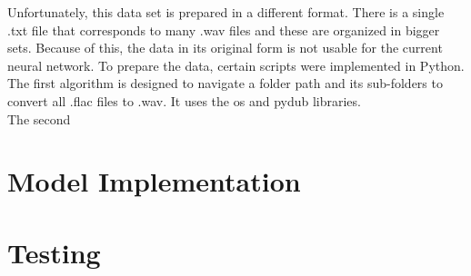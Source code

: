 Unfortunately, this data set is prepared in a different format. There is a single .txt file that corresponds to many .wav files and these are organized in bigger sets. Because of this, the data in its original form is not usable for the current neural network. To prepare the data, certain scripts were implemented in Python.\\
The first algorithm is designed to navigate a folder path and its sub-folders to convert all .flac files to .wav. It uses the os and pydub libraries.  \\
The second 







\section{Model Implementation}






\section{Testing}










